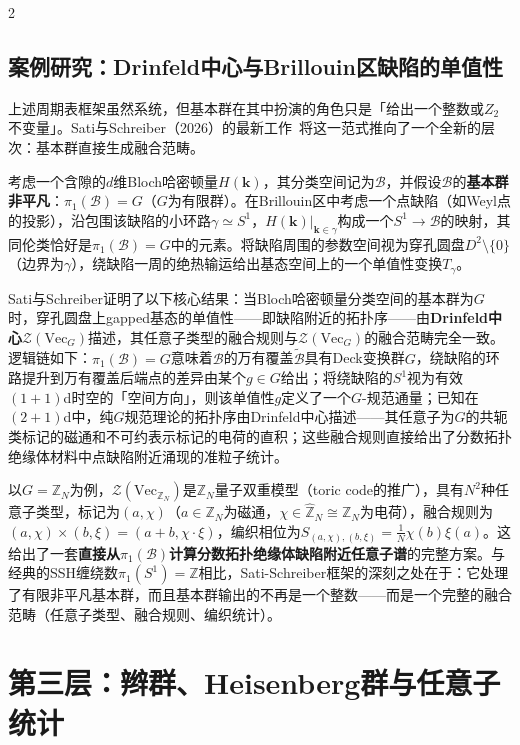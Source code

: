 \documentclass[a4paper,11pt]{ctexart}
\begin{document}
\begin{multicols}{2}
\subsection{案例研究：Drinfeld中心与Brillouin区缺陷的单值性}

上述周期表框架虽然系统，但基本群在其中扮演的角色只是「给出一个整数或$Z_2$不变量」。Sati与Schreiber（2026）的最新工作~\cite{Sati2026Drinfeld}将这一范式推向了一个全新的层次：基本群直接生成融合范畴。

考虑一个含隙的$d$维Bloch哈密顿量$H(\mathbf{k})$，其分类空间记为$\mathcal{B}$，并假设$\mathcal{B}$的\textbf{基本群非平凡}：$\pi_1(\mathcal{B})=G$（$G$为有限群）。在Brillouin区中考虑一个点缺陷（如Weyl点的投影），沿包围该缺陷的小环路$\gamma\simeq S^1$，$H(\mathbf{k})|_{\mathbf{k}\in\gamma}$构成一个$S^1\to\mathcal{B}$的映射，其同伦类恰好是$\pi_1(\mathcal{B})=G$中的元素。将缺陷周围的参数空间视为穿孔圆盘$D^2\setminus\{0\}$（边界为$\gamma$），绕缺陷一周的绝热输运给出基态空间上的一个单值性变换$T_\gamma$。

Sati与Schreiber证明了以下核心结果：当Bloch哈密顿量分类空间的基本群为$G$时，穿孔圆盘上gapped基态的单值性——即缺陷附近的拓扑序——由\textbf{Drinfeld中心}$\mathcal{Z}(\mathrm{Vec}_G)$描述，其任意子类型的融合规则与$\mathcal{Z}(\mathrm{Vec}_G)$的融合范畴完全一致。逻辑链如下：$\pi_1(\mathcal{B})=G$意味着$\mathcal{B}$的万有覆盖$\widetilde{\mathcal{B}}$具有Deck变换群$G$，绕缺陷的环路提升到万有覆盖后端点的差异由某个$g\in G$给出；将绕缺陷的$S^1$视为有效$(1+1)$d时空的「空间方向」，则该单值性$g$定义了一个$G$-规范通量；已知在$(2+1)$d中，纯$G$规范理论的拓扑序由Drinfeld中心描述——其任意子为$G$的共轭类标记的磁通和不可约表示标记的电荷的直积；这些融合规则直接给出了分数拓扑绝缘体材料中点缺陷附近涌现的准粒子统计。

以$G=\mathbb{Z}_N$为例，$\mathcal{Z}(\mathrm{Vec}_{\mathbb{Z}_N})$是$\mathbb{Z}_N$量子双重模型（toric code的推广），具有$N^2$种任意子类型，标记为$(a,\chi)$（$a\in\mathbb{Z}_N$为磁通，$\chi\in\widehat{\mathbb{Z}}_N\cong\mathbb{Z}_N$为电荷），融合规则为$(a,\chi)\times(b,\xi)=(a+b,\chi\cdot\xi)$，编织相位为$S_{(a,\chi),(b,\xi)}=\frac{1}{N}\chi(b)\xi(a)$。这给出了一套\textbf{直接从$\pi_1(\mathcal{B})$计算分数拓扑绝缘体缺陷附近任意子谱}的完整方案。与经典的SSH缠绕数$\pi_1(S^1)=\mathbb{Z}$相比，Sati-Schreiber框架的深刻之处在于：它处理了有限非平凡基本群，而且基本群输出的不再是一个整数——而是一个完整的融合范畴（任意子类型、融合规则、编织统计）。

\section{第三层：辫群、Heisenberg群与任意子统计}


\end{multicols}
\end{document}
